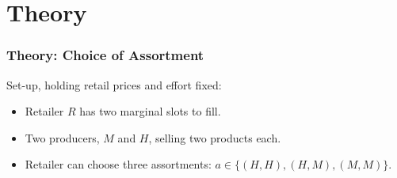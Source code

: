 \documentclass[aspectratio=169,11pt]{beamer}
\begin{document}
\section{Theory}

\begin{frame}[label=intuition]
\frametitle{Theory: Choice of Assortment}
Set-up, holding retail prices and effort fixed:
\begin{itemize}
\item Retailer $R$ has two marginal slots to fill.
\item Two producers, $M$ and $H$, selling two products each.
\item Retailer can choose three assortments: $a \in \{ (H,H), (H,M), (M,M)\}$.
\end{itemize}
\end{frame}
\end{document}
